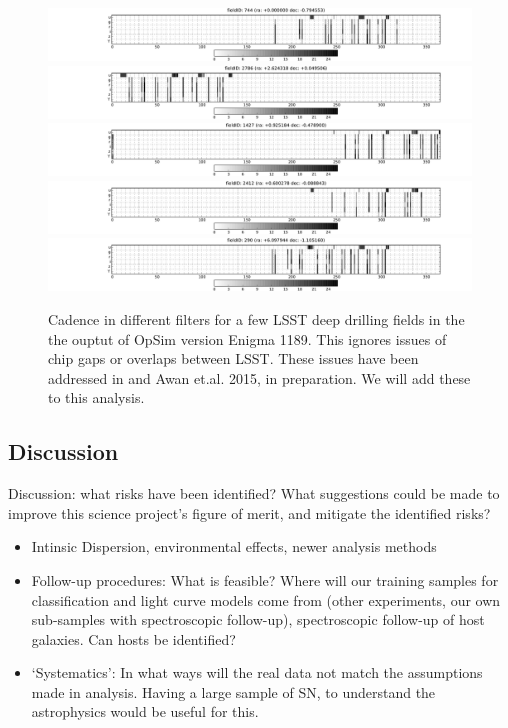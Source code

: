 \begin{figure}
\includegraphics[width=\textwidth]{figs/supernova/fig_firstSeason_0}
\includegraphics[width=\textwidth]{figs/supernova/fig_firstSeason_1}
\includegraphics[width=\textwidth]{figs/supernova/fig_firstSeason_2}
\includegraphics[width=\textwidth]{figs/supernova/fig_firstSeason_3}
\includegraphics[width=\textwidth]{figs/supernova/fig_firstSeason_4}
\label{fig:opsimSummary}
\caption{Cadence in different filters for a few LSST deep drilling fields in
    the the ouptut of OpSim version Enigma 1189. This ignores issues of chip 
gaps or overlaps between LSST. These issues have been addressed in \citep{CarrollEtal2014} and Awan et.al. 2015, in preparation. We will add these to this analysis.}
\end{figure}




\subsection{Discussion}
\label{sec:keyword:discussion}

Discussion: what risks have been identified? What suggestions could be
made to improve this science project's figure of merit, and mitigate
the identified risks?


\begin{itemize}
\item Intinsic Dispersion, environmental effects, newer analysis methods
\item Follow-up procedures: What is feasible? Where will our training samples for classification and light curve models come from (other experiments, our own 
sub-samples with spectroscopic follow-up), spectroscopic follow-up of host galaxies. Can hosts be identified?
\item `Systematics': In what ways will the real data not match the assumptions made in analysis. Having a large sample of SN, to understand the astrophysics would be useful for this. 
\end{itemize}



\navigationbar
